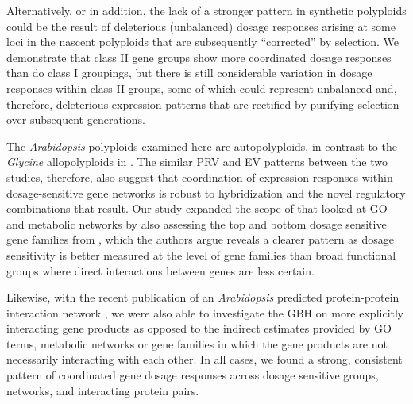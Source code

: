 \documentclass[11pt]{article}
\begin{document}
Alternatively, or in addition, the lack of a stronger pattern in synthetic polyploids could be the result of deleterious (unbalanced) dosage responses arising at some loci in the nascent polyploids that are subsequently ``corrected'' by selection. We demonstrate that class II gene groups show more coordinated dosage responses than do class I groupings, but there is still considerable variation in dosage responses within class II groups, some of which could represent unbalanced and, therefore, deleterious expression patterns that are rectified by purifying selection over subsequent generations. 

The {\it Arabidopsis} polyploids examined here are autopolyploids, in contrast to the {\it Glycine} allopolyploids in \cite{coate2016}. The similar PRV and EV patterns between the two studies, therefore, also suggest that coordination of expression responses within dosage-sensitive gene networks is robust to hybridization and the novel regulatory combinations that result. Our study expanded the scope of \cite{coate2016} that looked at GO and metabolic networks by also assessing the top and bottom dosage sensitive gene families from \cite{tasdighian2017}, which the authors argue reveals a clearer pattern as dosage sensitivity is better measured at the level of gene families than broad functional groups where direct interactions between genes are less certain. 

Likewise, with the recent publication of an {\it Arabidopsis} predicted protein-protein interaction network \citep{dong2019}, we were also able to investigate the GBH on more explicitly interacting gene products as opposed to the indirect estimates provided by GO terms, metabolic networks or gene families  in which the gene products are not necessarily interacting with each other. In all cases, we found a strong, consistent pattern of coordinated gene dosage responses across dosage sensitive groups, networks, and interacting protein pairs.
\end{document}

